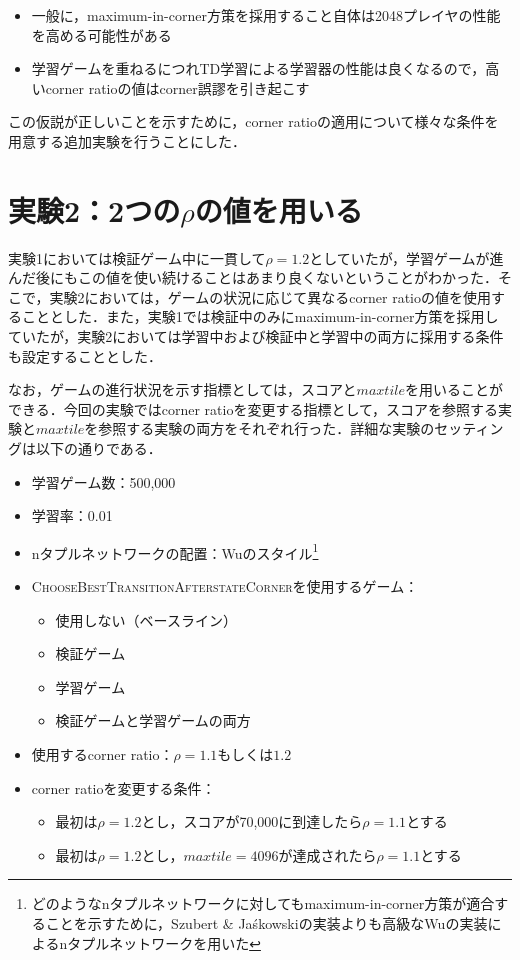 \documentclass{suribt}
\begin{document}
\begin{itemize}
\item 一般に，maximum-in-corner方策を採用すること自体は2048プレイヤの性能を高める可能性がある
\item 学習ゲームを重ねるにつれTD学習による学習器の性能は良くなるので，高いcorner ratioの値はcorner誤謬を引き起こす
\end{itemize}

この仮説が正しいことを示すために，corner ratioの適用について様々な条件を用意する追加実験を行うことにした．

\section{実験2：2つの${\rho}$の値を用いる}
実験1においては検証ゲーム中に一貫して${\rho}=1.2$としていたが，学習ゲームが進んだ後にもこの値を使い続けることはあまり良くないということがわかった．そこで，実験2においては，ゲームの状況に応じて異なるcorner ratioの値を使用することとした．また，実験1では検証中のみにmaximum-in-corner方策を採用していたが，実験2においては学習中および検証中と学習中の両方に採用する条件も設定することとした．

なお，ゲームの進行状況を示す指標としては，スコアと$maxtile$を用いることができる．今回の実験ではcorner ratioを変更する指標として，スコアを参照する実験と$maxtile$を参照する実験の両方をそれぞれ行った．詳細な実験のセッティングは以下の通りである．

\begin{itemize}
\item 学習ゲーム数：500,000
\item 学習率：0.01
\item nタプルネットワークの配置：Wuのスタイル\footnote{どのようなnタプルネットワークに対してもmaximum-in-corner方策が適合することを示すために，Szubert \& Ja\'{s}kowskiの実装よりも高級なWuの実装によるnタプルネットワークを用いた}
\item \textsc{ChooseBestTransitionAfterstateCorner}を使用するゲーム：
\begin{itemize}
\item 使用しない（ベースライン）
\item 検証ゲーム
\item 学習ゲーム
\item 検証ゲームと学習ゲームの両方
\end{itemize}
\item 使用するcorner ratio：${\rho}=1.1 \text{もしくは} 1.2$
\item corner ratioを変更する条件：
\begin{itemize}
\item 最初は${\rho}=1.2$とし，スコアが70,000に到達したら${\rho}=1.1$とする
\item 最初は${\rho}=1.2$とし，$maxtile=4096$が達成されたら${\rho}=1.1$とする
\end{itemize}
\end{itemize}
\end{document}
